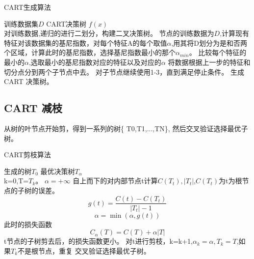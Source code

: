 \documentclass[UTF8]{ctexart}
\begin{document}
\begin{algorithm}[htb]
	\begin{algorithmic}[1]
		\caption{CART生成算法}
		\REQUIRE 训练数据集$D$
		\ENSURE CART决策树 $f(x)$\\
		对训练数据,递归的进行二划分，构建二叉决策树。
		\STATE 
		节点的训练数据为$D$,计算现有特征对该数据集的基尼指数，对每个特征A的每个取值$\alpha$,用其将D划分为是和否两个区域，计算此时的基尼指数，选择基尼指数最小的那个$\alpha_{min}$。		
		\STATE 
		比较每个特征的最小的$\alpha$,选取最小的基尼指数对应的特征以及对应的$\alpha$
		\STATE 
		将数据根据上一步的特征和切分点分到两个子节点中去。
		\STATE 
		对子节点继续使用1-3，直到满足停止条件。
		\STATE 
		生成CART 决策树。
	\end{algorithmic}
\end{algorithm}


\subsection{CART 减枝}
\noindent 从树的叶节点开始剪，得到一系列的树\{  T0,T1,...,TN\}, 然后交叉验证选择最优子树。

\begin{algorithm}[htb]
	\begin{algorithmic}[1]
		\caption{CART剪枝算法}
		\REQUIRE 生成的树$T_0$
		\ENSURE 最优决策树$T_\alpha$\\
		
		\STATE 
		k=0,T=$T_k$。		
		\STATE 
		$\alpha = + \infty$
		\STATE 
		自上而下的对内部节点t计算$C(T_t),|T_t|$,$C(T_t)$为t为根节点的子树的误差。
		$$
		g(t) = \frac{C(t)- C(T_t)}{|T_t| - 1}
		$$
		$$
		\alpha = \min(\alpha,g(t))
		$$
		此时的损失函数
		$$
		C_\alpha(T) = C(T) + \alpha |T|
		$$
		t节点的子树剪去后，的损失函数更小。
		\STATE 
		对t进行剪枝，k=k+1,$\alpha_k = \alpha, T_k = T $,如果$T_k$不是根节点，重复 
		\STATE 
		交叉验证选择最优子树。
	\end{algorithmic}
\end{algorithm}




\end{document}
